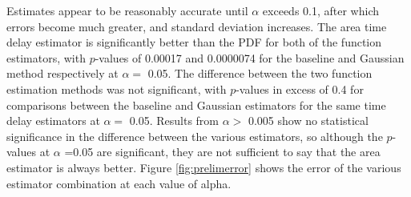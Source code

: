 \documentclass[a4paper,11pt]{article}
\begin{document}
    Estimates appear to be reasonably accurate until $\alpha$ exceeds 0.1, after
    which errors become much greater, and standard deviation increases. The area
    time delay estimator is significantly better than the PDF for both of the
    function estimators, with $p$-values of 0.00017 and 0.0000074 for the baseline
    and Gaussian method respectively at $\alpha=$ 0.05. The difference between the
    two function estimation methods was not significant, with $p$-values in excess
    of 0.4 for comparisons between the baseline and Gaussian estimators for the same
    time delay estimators at $\alpha=$ 0.05. Results from $\alpha>$ 0.005 show no
    statistical significance in the difference between the various estimators, so
    although the $p$-values at $\alpha$ =0.05 are significant, they are not
    sufficient to say that the area estimator is always better. Figure
    \ref{fig:prelimerror} shows the error of the various estimator combination at
    each value of alpha.
\end{document}
